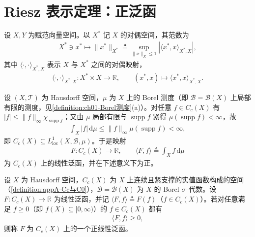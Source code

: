 \documentclass[../../main.tex]{subfiles}%
\begin{document}
\section{Riesz 表示定理：正泛函}\label{section:ch02-Riesz正泛函}

设 $X,Y$ 为赋范向量空间。以 $X^*$ 记 $X$ 的对偶空间，其范数为
\begin{align*}
X^*\ni x^*\mapsto\|x^*\|_{X^*}\triangleq\sup_{\|x\|_X\leqslant1}\left|\langle x^*,x\rangle_{X^*,X}\right|,
\end{align*}
其中 $\langle\cdot,\cdot\rangle_{X^*,X}$ 表示 $X$ 与 $X^*$ 之间的对偶映射，
\begin{align*}
\langle\cdot,\cdot\rangle_{X^*,X}:X^*\times X\to\mathbb R,\qquad(x^*,x)\mapsto\langle x^*,x\rangle_{X^*,X}.
\end{align*}

设 $(X,\mathscr T)$ 为 Hausdorff 空间，$\mu$ 为 $X$ 上的 Borel 测度（即 $\mathscr B=\mathscr B(X)$ 上局部有限的测度，见\cref{definition:ch01-Borel测度}(a)）。对任意 $f\in C_c(X)$ 有 $|f|\leqslant\|f\|_\infty\chi_{\operatorname{supp}f}$；又由 $\mu$ 局部有限与 $\operatorname{supp}f$ 紧得 $\mu(\operatorname{supp}f)<\infty$，故
\begin{align*}
\int_X|f|\,\mathrm{d}\mu\leqslant\|f\|_\infty\mu(\operatorname{supp}f)<\infty,
\end{align*}
即 $C_c(X)\subseteq L^1_{\mathrm{loc}}(X,\mathscr B,\mu)$。于是映射
\begin{align*}
F:C_c(X)\to\mathbb R,\qquad\langle F,f\rangle\triangleq\int_Xf\,\mathrm{d}\mu
\end{align*}
为 $C_c(X)$ 上的线性泛函，并在下述意义下为正。

\begin{definition}[正线性泛函]\label{definition:ch02-正泛函}
设 $X$ 为 Hausdorff 空间，$C_c(X)$ 为 $X$ 上连续且紧支撑的实值函数构成的空间（\cref{definition:appA-Cc与C0}），$\mathscr B=\mathscr B(X)$ 为 $X$ 的 Borel $\sigma$--代数。设 $F:C_c(X)\to\mathbb R$ 为线性泛函，并记 $\langle F,f\rangle\triangleq F(f)$（$f\in C_c(X)$）。若对任意满足 $f\geqslant0$（即 $f(X)\subseteq[0,\infty)$）的 $f\in C_c(X)$ 都有
\begin{align*}
\langle F,f\rangle\geqslant0,
\end{align*}
则称 $F$ 为 $C_c(X)$ 上的一个正线性泛函。
\end{definition}
\end{document}
